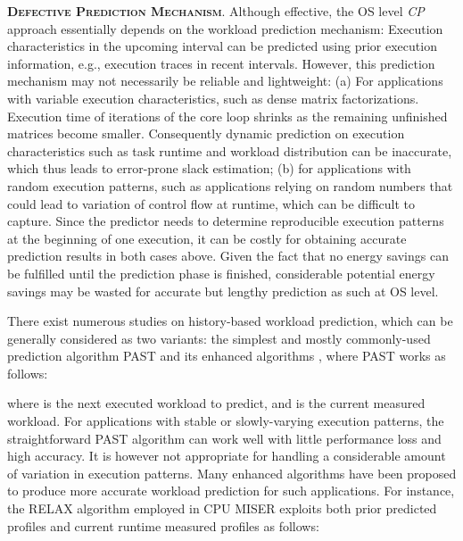 \documentclass[12pt]{elsarticle}
\begin{document}
\vspace{1mm}
\noindent\textsc{\textbf{Defective Prediction Mechanism}}. Although effective, the OS level \emph{CP} approach essentially depends on the workload prediction mechanism: Execution characteristics in the upcoming interval can be predicted using prior execution information, e.g., execution traces in recent intervals. However, this prediction mechanism may not necessarily be reliable and lightweight: (a) For applications with variable execution characteristics, such as dense matrix factorizations. Execution time of iterations of the core loop shrinks as the remaining unfinished matrices become smaller. Consequently dynamic prediction on execution characteristics such as task runtime and workload distribution can be inaccurate, which thus leads to error-prone slack estimation; (b) for applications with random execution patterns, such as applications relying on random numbers that could lead to variation of control flow at runtime, which can be difficult to capture. Since the predictor needs to determine reproducible execution patterns at the beginning of one execution, it can be costly for obtaining accurate prediction results in both cases above. Given the fact that no energy savings can be fulfilled until the prediction phase is finished, considerable potential energy savings may be wasted for accurate but lengthy prediction as such at OS level.

There exist numerous studies on history-based workload prediction, which can be generally considered as two variants: the simplest and mostly commonly-used prediction algorithm PAST \cite{osdi94} and its enhanced algorithms \cite{cases03} \cite{date04} \cite{sc05c} \cite{icpp07}, where PAST works as follows:

\vspace{-5mm}


\noindent where  is the next executed workload to predict, and  is the current measured workload. For applications with stable or slowly-varying execution patterns, the straightforward PAST algorithm can work well with little performance loss and high accuracy. It is however not appropriate for handling a considerable amount of variation in execution patterns. Many enhanced algorithms have been proposed to produce more accurate workload prediction for such applications. For instance, the RELAX algorithm employed in CPU MISER \cite{icpp07} exploits both prior predicted profiles and current runtime measured profiles as follows:

\vspace{-5mm}
\end{document}
